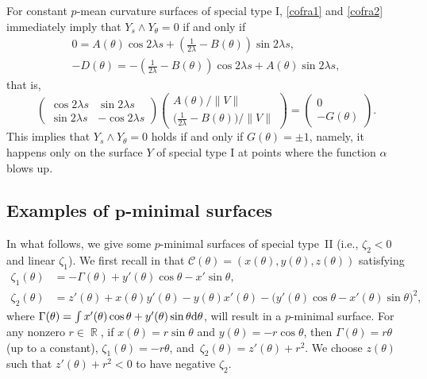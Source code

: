 \documentclass[10pt,a4paper]{amsart}
\numberwithin{equation}{section}
\DeclareMathOperator{\R}{\mathbb R}
\begin{document}
For constant $p$-mean curvature surfaces of special type I, \eqref{cofra1} and \eqref{cofra2} immediately imply that $Y_{s}\wedge Y_{\theta}=0$ if and only if
\begin{gather*}
0=A(\theta)\cos{2\lambda s}+\left(\frac{1}{2\lambda}-B(\theta)\right)\sin{2\lambda s},\\
-D(\theta)=-\left(\frac{1}{2\lambda}-B(\theta)\right)\cos{2\lambda s}+A(\theta)\sin{2\lambda s},
\end{gather*}
that is,
\[\left(\begin{matrix}
\cos{2\lambda s}&\sin{2\lambda s}\\\sin{2\lambda s}&-\cos{2\lambda s}
\end{matrix}\right)\left(\begin{matrix}A(\theta)/\|V\| \\ \bigl(\frac{1}{2\lambda}-B(\theta)\bigr)/\|V\|\end{matrix}\right)=\left(\begin{matrix}
0\\-G(\theta)\end{matrix}\right).\]
This implies that $Y_{s}\wedge Y_{\theta}=0$ holds if and only if $G(\theta)=\pm 1$, namely, it happens only on the surface $Y$ of special type I at points where the function $\alpha$ blows up.

\subsection[Examples of p-minimal surfaces]{Examples of $\boldsymbol{p}$-minimal surfaces}\label{section5.3}

In what follows, we give some $p$-minimal surfaces of special type~II (i.e., $\zeta_2<0$ and linear $\zeta_1$). We first recall in \cite{ChiuH/LiuH:2022} that $\mathcal C(\theta)=(x(\theta),y(\theta),z(\theta))$ satisfying
\begin{align*}%
\zeta_1(\theta)&=-\Gamma(\theta)+y'(\theta)\cos\theta-x'\sin\theta,\\
\zeta_2(\theta)&=z'(\theta)+x(\theta)y'(\theta)-y(\theta)x'(\theta)-\bigl(y'(\theta)\cos\theta-x'(\theta)\sin\theta\bigr)^2,
\end{align*}
where $\Gamma(\theta)=\int x'(\theta)\cos\theta+y'(\theta)\sin\theta {\rm d}\theta$, will result in a $p$-minimal surface. For any nonzero $r\in\R$, if $x(\theta)=r\sin\theta$ and $y(\theta)=-r\cos\theta$,
then $\Gamma(\theta)=r\theta$ (up to a constant), $\zeta_1(\theta)=-r\theta$, and~${\zeta_2(\theta)=z'(\theta)+r^2}$.
We choose $z(\theta)$ such that $z'(\theta)+r^2<0$ to have negative $\zeta_2$.
\end{document}
